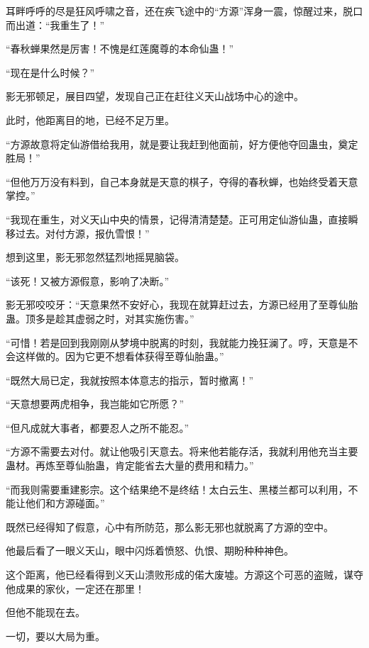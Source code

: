 
\begin{this_body}



耳畔呼呼的尽是狂风呼啸之音，还在疾飞途中的“方源”浑身一震，惊醒过来，脱口而出道：“我重生了！”

“春秋蝉果然是厉害！不愧是红莲魔尊的本命仙蛊！”

“现在是什么时候？”

影无邪顿足，展目四望，发现自己正在赶往义天山战场中心的途中。

此时，他距离目的地，已经不足万里。

“方源故意将定仙游借给我用，就是要让我赶到他面前，好方便他夺回蛊虫，奠定胜局！”

“但他万万没有料到，自己本身就是天意的棋子，夺得的春秋蝉，也始终受着天意掌控。”

“我现在重生，对义天山中央的情景，记得清清楚楚。正可用定仙游仙蛊，直接瞬移过去。对付方源，报仇雪恨！”

想到这里，影无邪忽然猛烈地摇晃脑袋。

“该死！又被方源假意，影响了决断。”

影无邪咬咬牙：“天意果然不安好心，我现在就算赶过去，方源已经用了至尊仙胎蛊。顶多是趁其虚弱之时，对其实施伤害。”

“可惜！若是回到我刚刚从梦境中脱离的时刻，我就能力挽狂澜了。哼，天意是不会这样做的。因为它更不想看体获得至尊仙胎蛊。”

“既然大局已定，我就按照本体意志的指示，暂时撤离！”

“天意想要两虎相争，我岂能如它所愿？”

“但凡成就大事者，都要忍人之所不能忍。”

“方源不需要去对付。就让他吸引天意去。将来他若能存活，我就利用他充当主要蛊材。再炼至尊仙胎蛊，肯定能省去大量的费用和精力。”

“而我则需要重建影宗。这个结果绝不是终结！太白云生、黑楼兰都可以利用，不能让他们和方源碰面。”

既然已经得知了假意，心中有所防范，那么影无邪也就脱离了方源的空中。

他最后看了一眼义天山，眼中闪烁着愤怒、仇恨、期盼种种神色。

这个距离，他已经看得到义天山溃败形成的偌大废墟。方源这个可恶的盗贼，谋夺他成果的家伙，一定还在那里！

但他不能现在去。

一切，要以大局为重。


\end{this_body}
